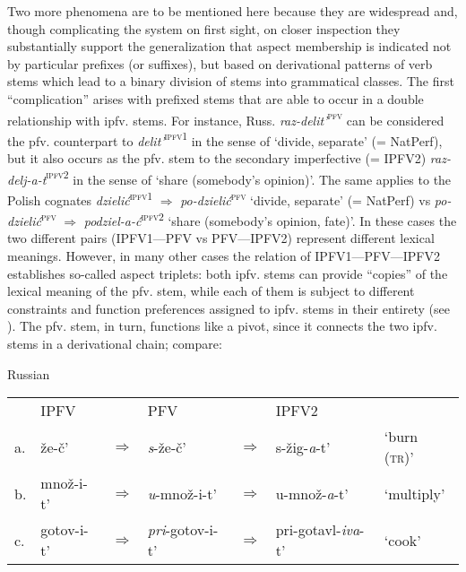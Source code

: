 \documentclass[output=paper]{langscibook}
\begin{document}
Two more phenomena are to be mentioned here because they are widespread and, though complicating the system on first sight, on closer inspection they substantially support the generalization that aspect membership is indicated not by particular prefixes (or suffixes), but based on derivational patterns of verb stems which lead to a binary division of stems into grammatical classes. The first “complication” arises with prefixed stems that are able to occur in a double relationship with ipfv. stems. For instance, Russ. \textit{raz-delit’}\textsc{\textsuperscript{pfv}} can be considered the pfv. counterpart to \textit{delit’}\textsc{\textsuperscript{ipfv1}} in the sense of ‘divide, separate’ (= NatPerf), but it also occurs as the pfv. stem to the secondary imperfective (= IPFV2) \textit{raz-delj-a-t}\textsc{\textsuperscript{ipfv2}} in the sense of ‘share (somebody’s opinion)’. The same applies to the Polish cognates \textit{dzielić}\textsc{\textsuperscript{ipfv1}} ${\Rightarrow}$ \textit{po-dzielić}\textsc{\textsuperscript{pfv}} ‘divide, separate’ (= NatPerf) vs \textit{po-dzielić}\textsc{\textsuperscript{pfv}} ${\Rightarrow}$ \textit{podziel-a-ć}\textsc{\textsuperscript{ipfv2}} ‘share (somebody’s opinion, fate)’. In these cases the two different pairs (IPFV1—PFV vs PFV—IPFV2) represent different lexical meanings. However, in many other cases the relation of IPFV1—PFV—IPFV2 establishes so-called aspect triplets: both ipfv. stems can provide “copies” of the lexical meaning of the pfv. stem, while each of them is subject to different constraints and function preferences assigned to ipfv. stems in their entirety (see ). The pfv. stem, in turn, functions like a pivot, since it connects the two ipfv. stems in a derivational chain; compare:

\ea \label{ex:wiemer:ab}Russian\smallskip\\
       \begin{tabular}[t]{@{} l@{~~}lclcll @{}}
           & IPFV                &               &  PFV                                        &               & IPFV2\\
        a. & {že-č’}      & $\Rightarrow$ & \textit{{s}}{{}-že-č’}        & $\Rightarrow$ & {s-žig-}\textit{{a}}{{}-t’} & ‘burn (\textsc{tr})’\\
        b. & {množ-i-t’}  & $\Rightarrow$ & \textit{{u}}{{}-množ-i-t’}    & $\Rightarrow$ & {u-množ-}\textit{{a}}{{}-t’} & ‘multiply’\\
        c. & {gotov-i-t’} & $\Rightarrow$ & \textit{{pri}}{{}-gotov-i-t’} & $\Rightarrow$ & {pri-gotavl-}\textit{{iva}}{{}-t’} & ‘cook’\\
        \end{tabular}
\z
\end{document}
